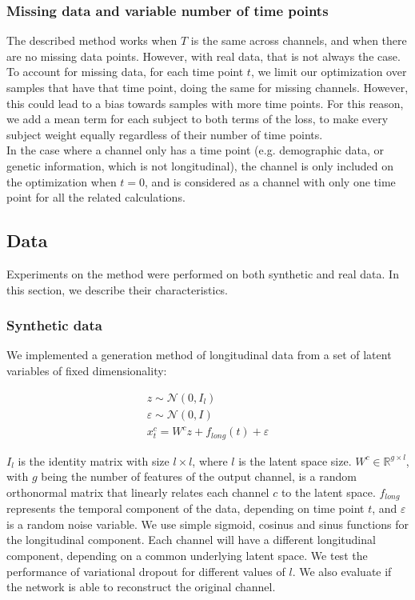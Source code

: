 \subsubsection{Missing data and variable number of time points}

The described method works when $T$ is the same across channels, and when there are no missing data points. However, with real data, that is not always the case. To account for missing data, for each time point $t$, we limit our optimization over samples that have that time point, doing the same for missing channels. However, this could lead to a bias towards samples with more time points. For this reason, we add a mean term for each subject to both terms of the loss, to make every subject weight equally regardless of their number of time points. \\

In the case where a channel only has a time point (e.g. demographic data, or genetic information, which is not longitudinal), the channel is only included on the optimization when $t=0$, and is considered as a channel with only one time point for all the related calculations.

\subsection{Data}

Experiments on the method were performed on both synthetic and real data. In this section, we describe their characteristics.

\subsubsection{Synthetic data}

We implemented a generation method of longitudinal data from a set of latent variables of fixed dimensionality:

\begin{equation} 
\begin{gathered} \label{rnn:eq:synthdata}
   z \sim \mathcal{N}(0, I_{l}) \\
   \varepsilon \sim \mathcal{N}(0, I) \\
   x^c_t = W^{c}z + f_{long}(t) + \varepsilon
\end{gathered}
\end{equation}

$I_{l}$ is the identity matrix with size $l \times l$, where $l$ is the latent space size. $W^c \in \mathbb{R}^{g \times l}$, with $g$ being the number of features of the output channel, is a random orthonormal matrix that linearly relates each channel $c$ to the latent space.  $f_{long}$ represents the temporal component of the data, depending on time point $t$, and $\varepsilon$ is a random noise variable. We use simple sigmoid, cosinus and sinus functions for the longitudinal component. Each channel will have a different longitudinal component, depending on a common underlying latent space. We test the performance of variational dropout for different values of $l$. We also evaluate if the network is able to reconstruct the original channel.   \\

